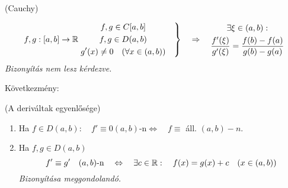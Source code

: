 \documentclass[a4paper,11.5pt]{article}
\begin{document}
	\begin{theorem}
		(Cauchy)
		
		\[f,g:[a,b]\to\mathbb{R}\left.\begin{gathered}
			f,g\in C[a,b]\\
			f,g\in D(a,b)\\
			g'(x)\not=0\quad (\forall x\in(a,b))
		\end{gathered}\quad \right\}\quad \Rightarrow\quad \begin{gathered}
		\exists \xi\in(a,b):\\
		\frac{f'(\xi)}{g'(\xi)}=\frac{f(b)-f(a)}{g(b)-g(a)}
		\end{gathered}\]
		\textit{Bizonyítás nem lesz kérdezve.}
	\end{theorem}
	Következmény:
	\begin{theorem}
		(A deriváltak egyenlősége)
		
		\begin{enumerate}
			\item Ha $f\in D(a,b):\quad f'\equiv0(a,b)$-n\quad $\Leftrightarrow\quad f\equiv$ áll. $(a,b)-n.$
			\item Ha $f,g\in D(a,b)$
			\[ f'\equiv g'\quad (a,b)\text{-n}\quad \Leftrightarrow\quad \exists c\in\mathbb{R}:\quad f(x)=g(x)+c\quad (x\in(a,b)) \]
			\textit{Bizonyítása meggondolandó.}
		\end{enumerate}
	\end{theorem}
\end{document}
